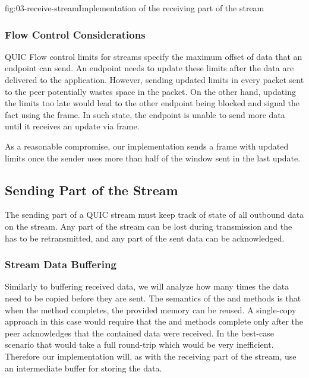 \begin{myFigure}{fig:03-receive-stream}{Implementation of the receiving part of the stream}

  \resizebox{\linewidth}{!}{}

\end{myFigure}

\subsubsection{Flow Control Considerations}

QUIC Flow control limits for streams specify the maximum offset of data that an endpoint can send.
An endpoint needs to update these limits after the data are delivered to the application. However,
sending updated limits in every packet sent to the peer potentially wastes space in the packet. On
the other hand, updating the limits too late would lead to the other endpoint being blocked and
signal the fact using the \STREAMDATABLOCKED{} frame. In such state, the endpoint is unable to send
more data until it receives an update via \MAXSTREAMDATA{} frame.

As a reasonable compromise, our implementation sends a \MAXSTREAMDATA{} frame with updated limits
once the sender uses more than half of the window sent in the last update.

\subsection{Sending Part of the Stream}

The sending part of a QUIC stream must keep track of state of all outbound data on the stream. Any
part of the stream can be lost during transmission and the has to be retransmitted, and any part of
the sent data can be acknowledged.


\subsubsection{Stream Data Buffering}

Similarly to buffering received data, we will analyze how many times the data need to be copied
before they are sent. The semantics of the  and  methods is that
when the method completes, the provided memory can be reused.  A
single-copy approach in this case would require that the  and 
methods complete only after the peer acknowledges that the contained data were received. In the
best-case scenario that would take a full round-trip which would be very inefficient. Therefore our
implementation will, as with the receiving part of the stream, use an intermediate buffer for
storing the data.

